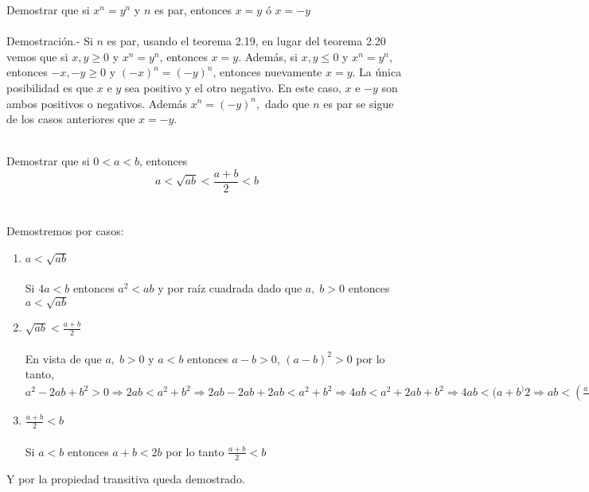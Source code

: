 \begin{teo}
Demostrar que si $x^n=y^n$ y $n$ es par, entonces $x=y$ ó $x=-y$\\\\
Demostración.- \; Si $n$ es par, usando el teorema 2.19, en lugar del teorema 2.20 vemos que si $x,y\geq 0$ y $x^n=y^n$, entonces $x=y$. Además, si $x,y\leq 0$ y $x^n=y^n$, entonces $-x,-y\geq 0$ y $(-x)^n=(-y)^n$, entonces nuevamente $x=y$. La única posibilidad es que $x$ e $y$ sea positivo y el otro negativo. En este caso, $x$ e $-y$ son ambos positivos o negativos. Además $x^n=(-y)^n,$ dado que $n$ es par se sigue de los casos anteriores que $x=-y$.\\\\
\end{teo}
   
\begin{teo}
Demostrar que si $0<a<b$, entonces
$$a<\sqrt{ab}<\displaystyle\frac{a+b}{2}<b$$\\\\
Demostremos por casos:
\begin{enumerate}[\bfseries 1.]
\item $a<\sqrt{ab}$\\\\
Si \; $4a<b$ entonces $a^2<ab$ y por raíz cuadrada dado que $a,\;b>0$ entonces $a<\sqrt{ab}$\\
\item $\sqrt{ab}<\displaystyle\frac{a+b}{2}$\\\\
En vista de que $a, \; b > 0$ y $a<b$ entonces $a-b>0$, \; $(a-b)^2>0$ por lo tanto, $a^2-2ab+b^2>0 \Rightarrow 2ab< a^2+b^2 \Rightarrow 2ab-2ab+2ab<a^2+b^2 \Rightarrow 4ab < a^2+2ab +b^2 \Rightarrow 4ab < (a+b^)2 \Rightarrow ab < \displaystyle \left( \frac{a+b}{2} \right) ^2 \Rightarrow \sqrt{ab}<\frac{a+b}{2} $ \\
\item $\displaystyle\frac{a+b}{2}<b$\\\\
Si $a<b$ entonces $a+b<2b$ por lo tanto $\displaystyle\frac{a+b}{2}<b$\\
\end{enumerate}
Y por la propiedad transitiva queda demostrado.\\\\
\end{teo}   
   
